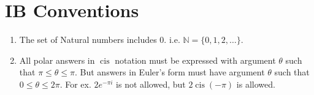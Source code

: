 \documentclass{report}
\DeclareMathOperator\cis{cis}
\theoremstyle{definition}
\numberwithin{equation}{section}
\begin{document}
\section{IB Conventions}
\begin{enumerate}
	\item The set of Natural numbers includes 0. i.e. $\mathbb{N} = \{0,1,2,\dots\}$.
	\item All polar answers in $\cis$ notation must be expressed with argument $\theta$ such that $\pi\le\theta\le\pi$. But answers in Euler's form must have argument $\theta$ such that $0 \le \theta \le 2 \pi$. For ex. $2e^{-\pi i}$ is not allowed, but $2\cis(-\pi)$ is allowed.
\end{enumerate}
\end{document}
